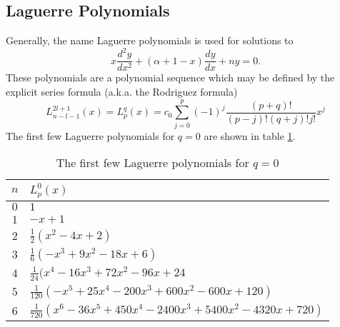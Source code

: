 \documentclass[]{article}
\begin{document}
\pagebreak

\begin{appendix}
\section{Laguerre Polynomials}
\label{app:laguerre}
Generally, the name Laguerre polynomials is used for solutions to 
\begin{equation}
x\frac{d^2y}{dx^2}+(\alpha+1-x)\frac{dy}{dx} + ny = 0.
\end{equation}
These polynomials are a polynomial sequence which may be defined by the explicit series formula (a.k.a. the Rodriguez formula)
\begin{equation}
L_{n-l-1}^{2l+1}(x) = L_p^q(x) = c_0 \sum_{j=0}^p (-1)^j\frac{(p+q)!}{(p-j)!(q+j)!j!}x^j
\end{equation}
The first few Laguerre polynomials for $q=0$ are shown in table \ref{tab:laguerre}.

\begin{table}[ht]
	\centering
	\caption{The first few Laguerre polynomials for $q=0$}
	\begin{tabular}{cl} \hline
	$n$ & $L_p^0(x)$  \\ \hline
	$0$ & $1$ \\
	$1$ & $-x+1$ \\
	$2$ & $\frac{1}{2}(x^2-4x+2)$ \\
	$3$ & $\frac{1}{6}(-x^3+9x^2-18x+6)$ \\
	$4$ & $\frac{1}{24}(x^4-16x^3+72x^2-96x+24$ \\
	$5$ & $\frac{1}{120}(-x^5+25x^4-200x^3+600x^2-600x+120) $ \\
	$6$ & $\frac{1}{720}(x^6-36x^5+450x^4-2400x^3+5400x^2-4320x+720)$ \\ \hline
	\end{tabular}
	\label{tab:laguerre}
\end{table}

\end{appendix}
\end{document}
